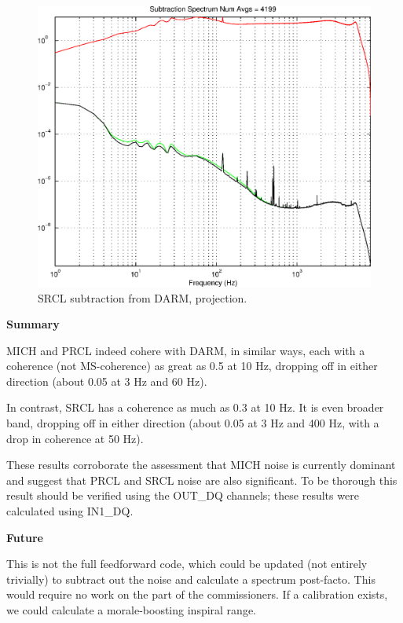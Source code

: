 \begin{figure}
\begin{center}
\includegraphics[width=0.4\paperwidth,height=0.3\paperheight]{SubtractionSpectrum-SRCL.eps}
\caption{
SRCL subtraction from DARM, projection.
}
\end{center}
\end{figure}

\textbf{Summary}

MICH and PRCL indeed cohere with DARM, in similar ways, each with a coherence (not MS-coherence) as great as 0.5 at 10 Hz, dropping off in either direction (about 0.05 at 3 Hz and 60 Hz).

In contrast, SRCL has a coherence as much as 0.3 at 10 Hz. It is even broader band, dropping off in either direction (about 0.05 at 3 Hz and 400 Hz, with a drop in coherence at 50 Hz).

These results corroborate the assessment that MICH noise is currently dominant and suggest that PRCL and SRCL noise are also significant. 
To be thorough this result should be verified using the OUT\_DQ channels; these results were calculated using IN1\_DQ.

\textbf{Future}

This is not the full feedforward code, which could be updated (not entirely trivially) to subtract out the noise and calculate a spectrum post-facto. This would require no work on the part of the commissioners. If a calibration exists, we could calculate a morale-boosting inspiral range.

